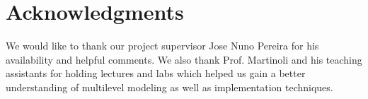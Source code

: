 \documentclass[a4paper, 10pt, conference]{ieeeconf}
\begin{document}
\section*{Acknowledgments}
  We would like to thank our project supervisor Jose Nuno Pereira for his availability and helpful comments. We also thank Prof. Martinoli and his teaching assistants for holding lectures and labs which helped us gain a better understanding of multilevel modeling as well as implementation techniques.
\end{document}
